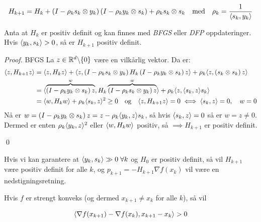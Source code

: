 \[
  H_{k+1} = H_k + \left(I - \rho_k s_k \otimes y_k\right) \left(I - \rho_k y_k \otimes s_k\right) + \rho_k s_k \otimes s_k \quad \text{med} \quad \rho_k = \frac{1}{\langle s_k, y_k\rangle}
\]

\begin{lemma}{}{}
  Anta at \( H_k \) er positiv definit og kan finnes med \textit{BFGS} eller \textit{DFP} oppdateringer.
  Hvis \( \langle y_k, s_k\rangle > 0 \), så er \( H_{k+1} \) positiv definit.
\end{lemma}

\begin{proof}{BFGS}{}
  La \( z \in \mathbb{R}^d \backslash \{0\} \) være en vilkårlig vektor.
  Da er:
  \begin{align*}
    \langle z, H_{k+1} z\rangle & = \langle z, H_k z\rangle + \langle z, \left(I - \rho_k s_k \otimes y_k\right)H_k \left(I - \rho_k y_k \otimes s_k\right) z\rangle + \rho_k \langle z, \left(s_k \otimes s_k\right) z\rangle   \\
                         & = \langle\overbrace{\left(I - \rho_k y_k \otimes s_k\right) z}^{w}, H_k \overbrace{\left(I - \rho_k s_k \otimes y_k\right) z}^{w}\rangle + \rho_k \langle z, \langle s_k, z\rangle s_k\rangle \\
                         & = \langle w, H_k w\rangle + \rho_k \langle s_k, z\rangle^2 \geq 0 \quad \text{og} \quad \langle z, H_{k+1} z\rangle = 0 \iff \langle s_k, z\rangle = 0, \quad w = 0
  \end{align*}
  Nå er \( w = \left(I - \rho_k y_k \otimes s_k\right) z = z - \rho_k \langle y_k, z\rangle s_k \), så hvis \( \langle s_k, z\rangle = 0 \) så er \( w = z \neq 0 \).
  Dermed er enten \( \rho_k\langle y_k, z\rangle^2\) eller \( \langle w, H_k w\rangle \) positiv, så \(\implies H_{k+1} \) er positiv definit.

  \qed
\end{proof}


Hvis vi kan garantere at \( \langle y_k, s_k\rangle \gg 0 \; \forall k \) og \( H_0 \) er positiv definit, så vil \( H_{k+1} \) være positiv definit for alle \( k \), og \(p_{k+1} = -H_{k+1} \nabla f(x_k) \) vil være en nedstigningsretning.

Hvis \( f \) er strengt konveks (og dermed \(x_{k+1} \neq x_k \) for alle \( k \)), så vil

\[
  \langle\nabla f(x_{k+1}) - \nabla f(x_k), x_{k+1} - x_k\rangle > 0
\]

